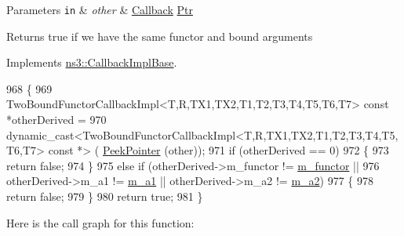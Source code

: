 \begin{DoxyParams}[1]{Parameters}
\mbox{\tt in}  & {\em other} & \hyperlink{classns3_1_1Callback}{Callback} \hyperlink{classns3_1_1Ptr}{Ptr} \\
\hline
\end{DoxyParams}
\begin{DoxyReturn}{Returns}
{\ttfamily true} if we have the same functor and bound arguments 
\end{DoxyReturn}


Implements \hyperlink{classns3_1_1CallbackImplBase_a199cb5c6bdf18e897bfcd59dfecde061}{ns3\+::\+Callback\+Impl\+Base}.


\begin{DoxyCode}
968                                                                  \{
969     TwoBoundFunctorCallbackImpl<T,R,TX1,TX2,T1,T2,T3,T4,T5,T6,T7> \textcolor{keyword}{const} *otherDerived = 
970       \textcolor{keyword}{dynamic\_cast<}TwoBoundFunctorCallbackImpl<T,R,TX1,TX2,T1,T2,T3,T4,T5,T6,T7> \textcolor{keyword}{const }*\textcolor{keyword}{>} (
      \hyperlink{namespacens3_af2a7557fe9afdd98d8f6f8f6e412cf5a}{PeekPointer} (other));
971     \textcolor{keywordflow}{if} (otherDerived == 0)
972       \{
973         \textcolor{keywordflow}{return} \textcolor{keyword}{false};
974       \}
975     \textcolor{keywordflow}{else} \textcolor{keywordflow}{if} (otherDerived->m\_functor != \hyperlink{classns3_1_1TwoBoundFunctorCallbackImpl_a5234eab89930da790dc2139129dcecb8}{m\_functor} ||
976              otherDerived->m\_a1 != \hyperlink{classns3_1_1TwoBoundFunctorCallbackImpl_a972666a7dde311627c08a002a10e3e7d}{m\_a1} || otherDerived->m\_a2 != \hyperlink{classns3_1_1TwoBoundFunctorCallbackImpl_a502215e2ad5a97c79e0e46bf4f4ca153}{m\_a2})
977       \{
978         \textcolor{keywordflow}{return} \textcolor{keyword}{false};
979       \}
980     \textcolor{keywordflow}{return} \textcolor{keyword}{true};
981   \}
\end{DoxyCode}


Here is the call graph for this function\+:



